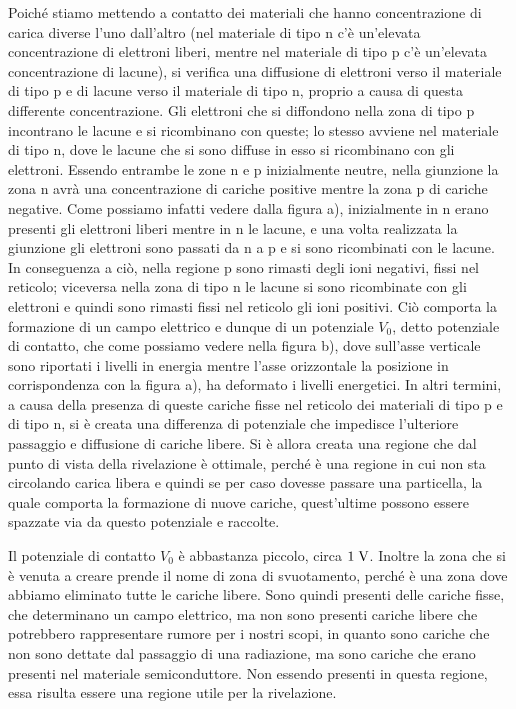 Poiché stiamo mettendo a contatto dei materiali che hanno concentrazione di carica diverse l'uno dall'altro (nel materiale di tipo n c'è un'elevata concentrazione di elettroni liberi, mentre nel materiale di tipo p c'è un'elevata concentrazione di lacune), si verifica una diffusione di elettroni verso il materiale di tipo p e di lacune verso il materiale di tipo n, proprio a causa di questa differente concentrazione. Gli elettroni che si diffondono nella zona di tipo p incontrano le lacune e si ricombinano con queste; lo stesso avviene nel materiale di tipo n, dove le lacune che si sono diffuse in esso si ricombinano con gli elettroni. Essendo entrambe le zone n e p inizialmente neutre, nella giunzione la zona n avrà una concentrazione di cariche positive mentre la zona p di cariche negative. Come possiamo infatti vedere dalla figura a), inizialmente in n erano presenti gli elettroni liberi mentre in n le lacune, e una volta realizzata la giunzione gli elettroni sono passati da n a p e si sono ricombinati con le lacune. In conseguenza a ciò, nella regione p sono rimasti degli ioni negativi, fissi nel reticolo; viceversa nella zona di tipo n le lacune si sono ricombinate con gli elettroni e quindi sono rimasti fissi nel reticolo gli ioni positivi. Ciò comporta la formazione di un campo elettrico e dunque di un potenziale $V_0$, detto potenziale di contatto, che come possiamo vedere nella figura b), dove sull'asse verticale sono riportati i livelli in energia mentre l'asse orizzontale la posizione in corrispondenza con la figura a), ha deformato i livelli energetici. In altri termini, a causa della presenza di queste cariche fisse nel reticolo dei materiali di tipo p e di tipo n, si è creata una differenza di potenziale che impedisce l'ulteriore passaggio e diffusione di cariche libere. Si è allora creata una regione che dal punto di vista della rivelazione è ottimale, perché è una regione in cui non sta circolando carica libera e quindi se per caso dovesse passare una particella, la quale comporta la formazione di nuove cariche, quest'ultime possono essere spazzate via da questo potenziale e raccolte.

Il potenziale di contatto $V_0$ è abbastanza piccolo, circa $1 \; \rm V$. Inoltre la zona che si è venuta a creare prende il nome di zona di svuotamento, perché è una zona dove abbiamo eliminato tutte le cariche libere. Sono quindi presenti delle cariche fisse, che determinano un campo elettrico, ma non sono presenti cariche libere che potrebbero rappresentare rumore per i nostri scopi, in quanto sono cariche che non sono dettate dal passaggio di una radiazione, ma sono cariche che erano presenti nel materiale semiconduttore. Non essendo presenti in questa regione, essa risulta essere una regione utile per la rivelazione.

